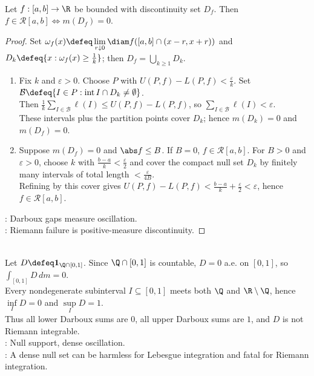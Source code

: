 \begin{theorem} \label{thm:lebesgue-criterion-riemann-integrability} \\
Let $f:[a,b]\to\R$ be bounded with discontinuity set $D_f$. Then $f\in\mathcal{R}[a,b]\Longleftrightarrow m(D_f)=0$.
\begin{proof}
Set $\omega_f(x)\defeq\lim\limits_{r\downarrow0}\diam f([a,b]\cap(x-r,x+r))$ and $D_k\defeq\{x:\omega_f(x)\geq\frac{1}{k}\}$; then $D_f=\bigcup\limits_{k\geq1}D_k$.
\begin{enumerate}[label=\roman*.]
\setlength{\itemsep}{0pt}
\item[$(\Rightarrow)$] Fix $k$ and $\varepsilon>0$. Choose $P$ with $U(P,f)-L(P,f)<\frac{\varepsilon}{k}$. Set $\mathcal{B}\defeq\{I\in P:\operatorname{int}I\cap D_k\neq\emptyset\}$.\\
Then $\frac{1}{k}\sum\limits_{I\in\mathcal{B}}\ell(I)\leq U(P,f)-L(P,f)$, so $\sum\limits_{I\in\mathcal{B}}\ell(I)<\varepsilon$.\\
These intervals plus the partition points cover $D_k$; hence $m(D_k)=0$ and $m(D_f)=0$.
\item[$(\Leftarrow)$] Suppose $m(D_f)=0$ and $\abs f\leq B$. If $B=0$, $f\in\mathcal{R}[a,b]$. For $B>0$ and $\varepsilon>0$, choose $k$ with $\frac{b-a}{k}<\frac{\varepsilon}{2}$ and cover the compact null set $D_k$ by finitely many intervals of total length $<\frac{\varepsilon}{4B}$.\\
Refining by this cover gives $U(P,f)-L(P,f)<\frac{b-a}{k}+\frac{\varepsilon}{2}<\varepsilon$, hence $f\in\mathcal{R}[a,b]$.
\end{enumerate}
: Darboux gaps measure oscillation.\\
: Riemann failure is positive-measure discontinuity.
\end{proof}
\end{theorem}

\begin{example} \label{ex:dirichlet-function-lebesgue-not-riemann} \\
Let $D\defeq\mathbf{1}_{\Q\cap[0,1]}$. Since $\Q\cap[0,1]$ is countable, $D=0$ a.e. on $[0,1]$, so $\int_{[0,1]}D\,dm=0$.\\
Every nondegenerate subinterval $I\subseteq[0,1]$ meets both $\Q$ and $\R\setminus\Q$, hence $\inf\limits_ID=0$ and $\sup\limits_ID=1$.\\
Thus all lower Darboux sums are $0$, all upper Darboux sums are $1$, and $D$ is not Riemann integrable.\\
: Null support, dense oscillation.\\
: A dense null set can be harmless for Lebesgue integration and fatal for Riemann integration.
\end{example}

